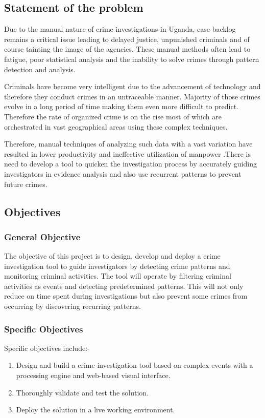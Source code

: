 \subsection{Statement of the problem}

\noindent Due to the manual nature of crime investigations in Uganda, case backlog remains a critical issue leading to delayed justice, unpunished criminals and of course tainting the image of the agencies. These manual methods often lead to fatigue, poor statistical analysis and the inability to solve crimes through pattern detection and analysis.

\noindent Criminals have become very intelligent due to the advancement of technology and therefore they conduct crimes in an untraceable manner. Majority of those crimes evolve in a long period of time making them even more difficult to predict. Therefore the rate of organized crime is on the rise most of which are orchestrated in vast geographical areas using these complex techniques.

\noindent Therefore, manual techniques of analyzing such data with a vast variation have resulted in lower productivity and ineffective utilization of manpower \cite{three}.There is need to develop a tool to quicken the investigation process by accurately guiding investigators in evidence analysis and also use recurrent patterns to prevent future crimes.

\subsection{Objectives}
\subsubsection{General Objective}

\noindent The objective of this project is to design, develop and deploy a crime investigation tool to guide investigators by detecting crime patterns and monitoring criminal activities. The tool will operate by filtering criminal activities as events and detecting predetermined patterns. This will not only reduce on time spent during investigations but also prevent some crimes from occurring by discovering recurring patterns. 

\subsubsection{Specific Objectives}
Specific objectives include:-
\begin{enumerate}
\item Design and build a crime investigation tool based on complex events with a processing engine and web-based visual interface.
\item Thoroughly validate and test the solution.
\item Deploy the solution in a live working environment.
 \end{enumerate}

